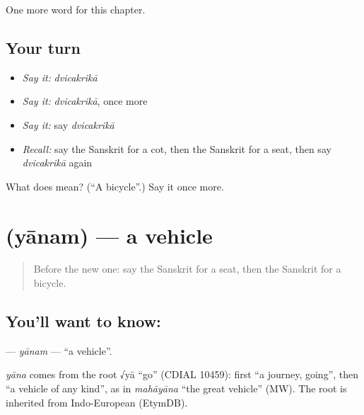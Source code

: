 \begin{grammarlens}[title={What you've built}]
One more word for this chapter.
\end{grammarlens}

\subsection*{Your turn}
\begin{itemize}
\raggedright
  \item \emph{Say it:} \emph{dvicakrikā}
  \item \emph{Say it:} \emph{dvicakrikā}, once more
  \item \emph{Say it:} say \emph{dvicakrikā}
  \item \emph{Recall:} say the Sanskrit for a cot, then the Sanskrit for a seat, then say \emph{dvicakrikā} again
\end{itemize}

\begin{tcolorbox}[breakable,colback=teal!4,colframe=teal!35!black,title={Before you move on}]
What does  mean? (\textquotedblleft{}A bicycle\textquotedblright{}.) Say it once more.
\end{tcolorbox}
\section[\texorpdfstring{\sk{यानम्} (yānam)}{यानम् (yānam)}]{ (yānam) — a vehicle}

\label{lesson:SA-C123-yanam}



\begin{quote}
Before the new one: say the Sanskrit for a seat, then the Sanskrit for a bicycle.
\end{quote}

\subsection*{You'll want to know: }
\textbf{} — \emph{yānam} — \textquotedblleft{}a vehicle\textquotedblright{}.

\begin{cousinweb}
\emph{yāna} comes from the root √yā \textquotedblleft{}go\textquotedblright{} (CDIAL 10459): first \textquotedblleft{}a journey, going\textquotedblright{}, then \textquotedblleft{}a vehicle of any kind\textquotedblright{}, as in \emph{mahāyāna} \textquotedblleft{}the great vehicle\textquotedblright{} (MW). The root is inherited from Indo-European (EtymDB).
\end{cousinweb}

